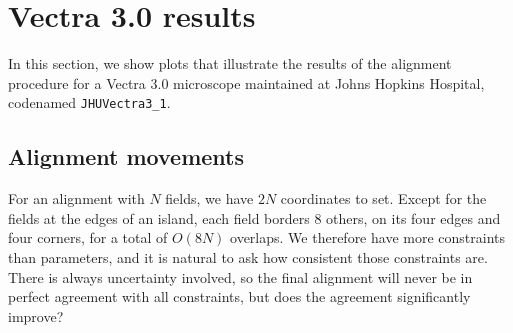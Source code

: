 \documentclass{article}
\begin{document}
\section{Vectra 3.0 results}

In this section, we show plots that illustrate the results of the alignment procedure for a Vectra 3.0 microscope maintained at Johns Hopkins Hospital, codenamed \texttt{JHUVectra3\_1}.

\subsection{Alignment movements}

For an alignment with $N$ fields, we have $2N$ coordinates to set.  Except for the fields at the edges of an island, each field borders $8$ others, on its four edges and four corners, for a total of $O(8N)$ overlaps.  We therefore have more constraints than parameters, and it is natural to ask how consistent those constraints are.  There is always uncertainty involved, so the final alignment will never be in perfect agreement with all constraints, but does the agreement significantly improve?
\end{document}
